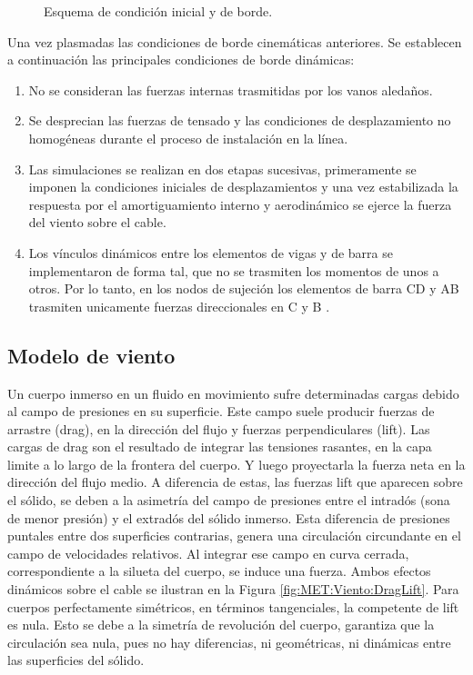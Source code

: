 \begin{figure}[htbp]
	\centering
	\def\svgwidth{80mm}
	
	\caption{Esquema de condición inicial y de borde.}
	\label{fig:MET:EsquemaCondiciones}
\end{figure}

Una vez plasmadas las condiciones de borde cinemáticas anteriores. Se establecen a continuación las principales condiciones de borde dinámicas:

\begin{enumerate}
	\item  No se consideran las fuerzas internas trasmitidas por los vanos aledaños.
	\item  Se desprecian las fuerzas de tensado y las condiciones de desplazamiento no homogéneas durante el proceso de instalación en la línea.
	\item Las simulaciones se realizan en dos etapas sucesivas, primeramente se imponen la condiciones iniciales de desplazamientos y una vez estabilizada la respuesta por el amortiguamiento interno y aerodinámico se ejerce la fuerza del viento sobre el cable. 
	\item Los vínculos dinámicos entre los elementos de vigas y de barra se implementaron de forma tal, que no se trasmiten los momentos de unos a otros. Por lo tanto, en los nodos de sujeción los elementos de barra CD y AB trasmiten unicamente fuerzas direccionales en C y B . 
\end{enumerate} 

 

\subsection{Modelo de viento}\label{Sec:PRE:Modeloviento}
Un cuerpo inmerso en un fluido en movimiento sufre determinadas cargas debido al campo de presiones en su superficie. Este campo suele producir fuerzas de arrastre (drag), en la dirección del flujo y fuerzas perpendiculares (lift). Las cargas de drag son el resultado de integrar las tensiones rasantes, en la capa limite a lo largo de la frontera del cuerpo. Y luego proyectarla la fuerza neta en la dirección del flujo medio. A diferencia de estas, las fuerzas lift que aparecen sobre el sólido, se deben a la asimetría del campo de presiones entre el intradós (sona de menor presión) y el extradós del sólido inmerso. Esta diferencia de presiones puntales entre dos superficies contrarias, genera una circulación circundante en el campo de velocidades relativos. Al integrar ese campo en curva cerrada, correspondiente a la silueta del cuerpo, se induce una fuerza. Ambos efectos dinámicos sobre el cable se ilustran en la Figura \ref{fig:MET:Viento:DragLift}. Para cuerpos perfectamente simétricos, en términos tangenciales, la competente de lift es nula.  Esto se debe a la simetría de revolución del cuerpo, garantiza que la circulación sea nula, pues no hay diferencias, ni geométricas, ni dinámicas entre las superficies del sólido. 


